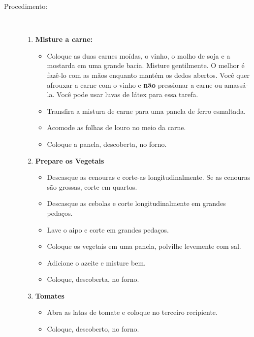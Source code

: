\documentclass[11pt,letterpaper]{article}
\begin{document}
\begin {description}
\item [Procedimento:] \ \\
\begin {enumerate}
\item {\bf Misture a carne:}
\begin {itemize}
\item Coloque as duas carnes moídas, o vinho, o molho de soja e a mostarda em uma grande bacia. Misture gentilmente. O melhor é fazê-lo com as mãos enquanto mantém os dedos abertos. Você quer afrouxar a carne com o vinho e {\bf não} pressionar a carne ou amassá-la. Você pode usar luvas de látex para essa tarefa.
\item Transfira a mistura de carne para uma panela de ferro esmaltada.
\item Acomode as folhas de louro no meio da carne.
\item Coloque a panela, descoberta, no forno.
\end {itemize}
\item {\bf Prepare os Vegetais}
\begin {itemize}
\item Descasque as cenouras e corte-as longitudinalmente. Se as cenouras são grossas, corte em quartos.
\item Descasque as cebolas e corte longitudinalmente em grandes pedaços.
\item Lave o aipo e corte em grandes pedaços.
\item Coloque os vegetais em uma panela, polvilhe levemente com sal.
\item Adicione o azeite e misture bem.
\item Coloque, descoberta, no forno.
\end {itemize}
\item {\bf Tomates}
\begin {itemize}
\item Abra as latas de tomate e coloque no terceiro recipiente.
\item Coloque, descoberto, no forno.
\end {itemize}



\end{enumerate}
\end{description}
\end{document}
